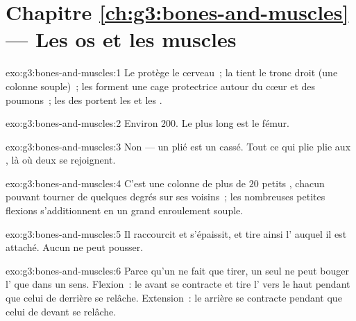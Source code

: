 \section*{Chapitre \ref{ch:g3:bones-and-muscles} --- Les os et les muscles}

\begin{solution}{exo:g3:bones-and-muscles:1}
Le  protège le cerveau~; la  tient le tronc
droit (une colonne souple)~; les  forment une cage protectrice
autour du cœur et des poumons~; les  des  portent les 
et les .
\end{solution}

\begin{solution}{exo:g3:bones-and-muscles:2}
Environ $200$. Le plus long est le fémur.
\end{solution}

\begin{solution}{exo:g3:bones-and-muscles:3}
Non --- un  plié est un  cassé. Tout ce qui plie plie aux
, là où deux  se rejoignent.
\end{solution}

\begin{solution}{exo:g3:bones-and-muscles:4}
C'est une colonne de plus de $20$ petits , chacun pouvant tourner
de quelques degrés sur ses voisins~; les nombreuses petites flexions
s'additionnent en un grand enroulement souple.
\end{solution}

\begin{solution}{exo:g3:bones-and-muscles:5}
Il raccourcit et s'épaissit, et tire ainsi l' auquel il est
attaché. Aucun  ne peut pousser.
\end{solution}

\begin{solution}{exo:g3:bones-and-muscles:6}
Parce qu'un  ne fait que tirer, un seul  ne peut bouger
l' que dans un sens. Flexion~: le  avant se
contracte et tire l' vers le haut pendant que celui de
derrière se relâche. Extension~: le  arrière se contracte
pendant que celui de devant se relâche.
\end{solution}

